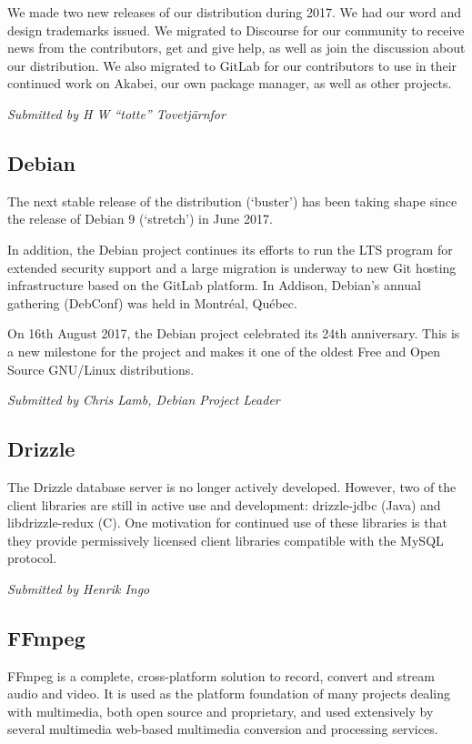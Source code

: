 \documentclass[a4paper]{report}
\begin{document}
We made two new releases of our distribution during 2017. We had our
word and design trademarks issued. We migrated to Discourse for our
community to receive news from the contributors, get and give help, as
well as join the discussion about our distribution. We also migrated to
GitLab for our contributors to use in their continued work on Akabei,
our own package manager, as well as other projects.

{\em Submitted by H W ``totte'' Tovetjärnfor}

\subsection{Debian}

The next stable release of the distribution (`buster') has been taking
shape since the release of Debian 9 (`stretch') in June 2017.

In addition, the Debian project continues its efforts to run the LTS
program for extended security support and a large migration is underway
to new Git hosting infrastructure based on the GitLab platform. In
Addison, Debian's annual gathering (DebConf) was held in Montréal,
Québec.

On 16th August 2017, the Debian project celebrated its 24th anniversary.
This is a new milestone for the project and makes it one of the oldest
Free and Open Source GNU/Linux distributions.

{\em Submitted by Chris Lamb, Debian Project Leader}

\subsection{Drizzle}

The Drizzle database server is no longer actively developed. However,
two of the client libraries are still in active use and development:
drizzle-jdbc (Java) and libdrizzle-redux (C). One motivation for
continued use of these libraries is that they provide permissively
licensed client libraries compatible with the MySQL protocol.

{\em Submitted by Henrik Ingo}

\subsection{FFmpeg}

FFmpeg is a complete, cross-platform solution to record, convert and
stream audio and video. It is used as the platform foundation of many
projects dealing with multimedia, both open source and proprietary, and
used extensively by several multimedia web-based multimedia conversion
and processing services.
\end{document}
